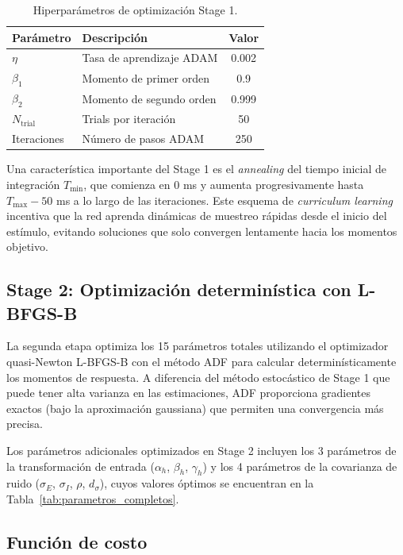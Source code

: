 \begin{table}[H]
\centering
\caption{Hiperparámetros de optimización Stage 1.}
\label{tab:stage1_params}
\begin{tabular}{llc}
\toprule
\textbf{Parámetro} & \textbf{Descripción} & \textbf{Valor} \\
\midrule
$\eta$ & Tasa de aprendizaje ADAM & 0.002 \\
$\beta_1$ & Momento de primer orden & 0.9 \\
$\beta_2$ & Momento de segundo orden & 0.999 \\
$N_\text{trial}$ & Trials por iteración & 50 \\
Iteraciones & Número de pasos ADAM & 250 \\
\bottomrule
\end{tabular}
\end{table}

Una característica importante del Stage 1 es el  \textit{annealing} del tiempo inicial de integración $T_{\min}$, que comienza en 0 ms y aumenta progresivamente hasta $T_{\max} - 50$ ms a lo largo de las iteraciones. Este esquema de  \textit{curriculum learning} incentiva que la red aprenda dinámicas de muestreo rápidas desde el inicio del estímulo, evitando soluciones que solo convergen lentamente hacia los momentos objetivo.

\subsection{Stage 2: Optimización determinística con L-BFGS-B}
\label{subsec:impl_stage2}

La segunda etapa optimiza los 15 parámetros totales utilizando el optimizador quasi-Newton \acrshort{L-BFGS-B} con el método \acrshort{ADF} para calcular determinísticamente los momentos de respuesta. A diferencia del método estocástico de Stage 1 que puede tener alta varianza en las estimaciones, \acrshort{ADF} proporciona gradientes exactos (bajo la aproximación gaussiana) que permiten una convergencia más precisa.

Los parámetros adicionales optimizados en Stage 2 incluyen los 3 parámetros de la transformación de entrada ($\alpha_h$, $\beta_h$, $\gamma_h$) y los 4 parámetros de la covarianza de ruido ($\sigma_E$, $\sigma_I$, $\rho$, $d_\sigma$), cuyos valores óptimos se encuentran en la Tabla~\ref{tab:parametros_completos}.

\subsection{Función de costo}
\label{subsec:impl_costo}

